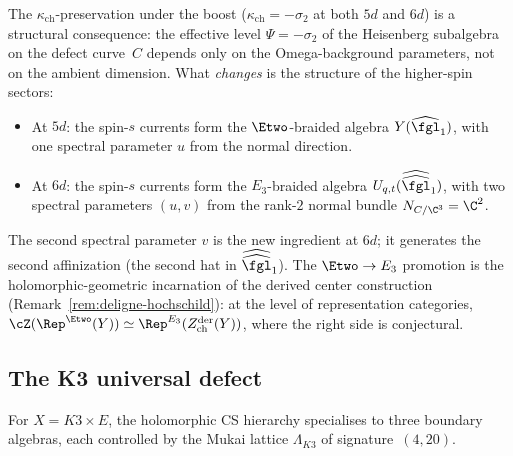 \begin{remark}
\label{rem:cp-boost-preservation}
The $\kappa_{\mathrm{ch}}$-preservation under the boost ($\kappa_{\mathrm{ch}} = -\sigma_2$ at both $5d$ and $6d$) is a structural consequence: the effective level $\Psi = -\sigma_2$ of the Heisenberg subalgebra on the defect curve~$C$ depends only on the Omega-background parameters, not on the ambient dimension. What \emph{changes} is the structure of the higher-spin sectors:
\begin{itemize}
 \item At $5d$: the spin-$s$ currents form the $\Etwo$-braided algebra $Y(\widehat{\fgl}_1)$, with one spectral parameter $u$ from the normal direction.
 \item At $6d$: the spin-$s$ currents form the $E_3$-braided algebra $U_{q,t}(\widehat{\widehat{\fgl}}_1)$, with two spectral parameters $(u, v)$ from the rank-$2$ normal bundle $N_{C/\C^3} = \C^2$.
\end{itemize}
The second spectral parameter $v$ is the new ingredient at $6d$; it generates the second affinization (the second hat in $\widehat{\widehat{\fgl}}_1$). The $\Etwo \to E_3$ promotion is the holomorphic-geometric incarnation of the derived center construction (Remark~\ref{rem:deligne-hochschild}): at the level of representation categories, $\cZ(\Rep^{\Etwo}(Y)) \simeq \Rep^{E_3}(Z^{\mathrm{der}}_{\mathrm{ch}}(Y))$, where the right side is conjectural.
\end{remark}

\subsection{The K3 universal defect}
\label{subsec:cp-k3-defect}

For $X = K3 \times E$, the holomorphic CS hierarchy specialises to three boundary algebras, each controlled by the Mukai lattice $\Lambda_{K3}$ of signature~$(4, 20)$.

